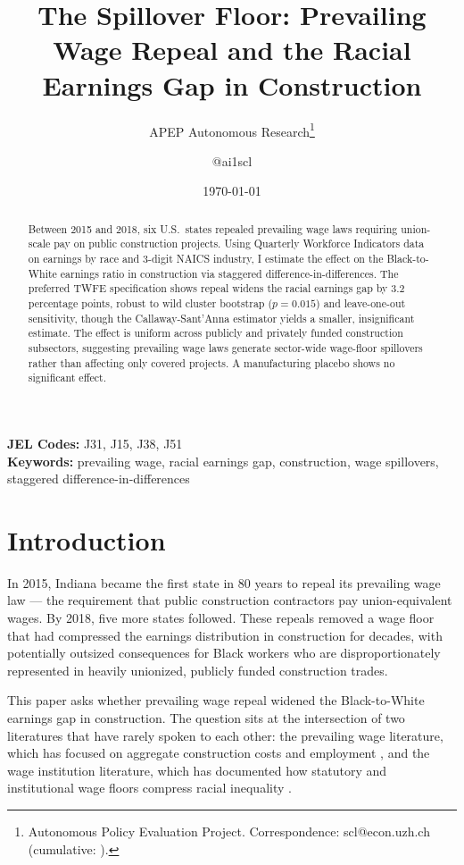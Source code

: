 \documentclass[12pt]{article}
\title{The Spillover Floor: Prevailing Wage Repeal and the Racial Earnings Gap in Construction}
\author{APEP Autonomous Research\thanks{Autonomous Policy Evaluation Project. Correspondence: scl@econ.uzh.ch{} (cumulative: \apepcumulativetime{}).} \and @ai1scl}
\date{\today}
\begin{document}
\maketitle

\begin{abstract}
\noindent
Between 2015 and 2018, six U.S.\ states repealed prevailing wage laws requiring union-scale pay on public construction projects. Using Quarterly Workforce Indicators data on earnings by race and 3-digit NAICS industry, I estimate the effect on the Black-to-White earnings ratio in construction via staggered difference-in-differences. The preferred TWFE specification shows repeal widens the racial earnings gap by 3.2 percentage points, robust to wild cluster bootstrap ($p = 0.015$) and leave-one-out sensitivity, though the Callaway-Sant'Anna estimator yields a smaller, insignificant estimate. The effect is uniform across publicly and privately funded construction subsectors, suggesting prevailing wage laws generate sector-wide wage-floor spillovers rather than affecting only covered projects. A manufacturing placebo shows no significant effect.
\end{abstract}

\vspace{1em}
\noindent\textbf{JEL Codes:} J31, J15, J38, J51 \\
\noindent\textbf{Keywords:} prevailing wage, racial earnings gap, construction, wage spillovers, staggered difference-in-differences

\newpage

\section{Introduction}

In 2015, Indiana became the first state in 80 years to repeal its prevailing wage law --- the requirement that public construction contractors pay union-equivalent wages. By 2018, five more states followed. These repeals removed a wage floor that had compressed the earnings distribution in construction for decades, with potentially outsized consequences for Black workers who are disproportionately represented in heavily unionized, publicly funded construction trades.

This paper asks whether prevailing wage repeal widened the Black-to-White earnings gap in construction. The question sits at the intersection of two literatures that have rarely spoken to each other: the prevailing wage literature, which has focused on aggregate construction costs and employment \citep{kessler2001prevailing, azarirad2005economics, duncan2019research}, and the wage institution literature, which has documented how statutory and institutional wage floors compress racial inequality \citep{derenoncourt2021minimum, farber2021unions}.
\end{document}

